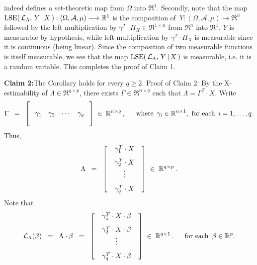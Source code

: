 indeed defines a set-theoretic map from $\Omega$ into $\Re^{1}$.
Secondly, note that the map
$\lse\!\left(\,\mathcal{L}_{\Lambda},\,Y\,\vert\,X\,\right) : (\Omega,\mathcal{A},\mu) \longrightarrow \Re^{1}$
is the composition of \,$Y : (\Omega,\mathcal{A},\mu) \rightarrow \Re^{n}$ followed by the
left multiplication by $\gamma^{T} \cdot \Pi_{X} \in \Re^{1 \times n}$ from $\Re^{n}$ into $\Re^{1}$.
$Y$ is measurable by hypothesis, while left multiplication by $\gamma^{T} \cdot \Pi_{X}$ is measurable
since it is continuous (being linear).
Since the composition of two measurable functions is itself measurable,
we see that the map $\lse\!\left(\,\mathcal{L}_{\Lambda},\,Y\,\vert\,X\,\right)$ is measurable,
i.e. it is a random variable.
This completes the proof of Claim 1.

\vskip 0.5cm
\noindent
\textbf{Claim 2:}\quad The Corollary holds for every $q \geq 2$.
\vskip 0.2cm
\noindent
Proof of Claim 2:\quad
By the X-estimability of $\Lambda \in \Re^{q \times p}$, there exists
$\Gamma \in \Re^{n \times q}$ such that $\Lambda = \Gamma^{T} \cdot X$.
Write
\begin{equation*}
\Gamma
\;\; = \;\;
	\left[\;\begin{array}{cccc}
	\\
	\gamma_{1} &
	\gamma_{2}&
	\cdots &
	\gamma_{q}
	\\ \\
	\end{array}\;\right]
	\;\in\; \Re^{n \times q}\,,
	\quad\;\;
	\textnormal{where \,$\gamma_{i} \in \Re^{n \times 1}$, \,for each \,$i = 1,\ldots,q$}.
\end{equation*}
Thus,
\begin{equation*}
\Lambda
\;\; = \;\;
	\left[\;\;\begin{array}{c}
	\gamma_{1}^{T} \cdot X \\
	\gamma_{2}^{T} \cdot \overset{{\color{white}\vert}}{X} \\
	\vdots \\
	\gamma_{q}^{T} \cdot \overset{{\color{white}\vert}}{X}
	\end{array}\;\;\right]
	\;\in\;\Re^{q \times p}\,.
\end{equation*}
Note that
\begin{equation*}
\mathcal{L}_{\Lambda}(\beta)
\;\; = \;\;
	\Lambda\cdot\beta
\;\; = \;\;
	\left[\;\;\begin{array}{c}
	\gamma_{1}^{T} \cdot X \cdot \beta \\
	\gamma_{2}^{T} \cdot \overset{{\color{white}\vert}}{X} \cdot \beta \\
	\vdots \\
	\gamma_{q}^{T} \cdot \overset{{\color{white}\vert}}{X} \cdot \beta
	\end{array}\;\;\right]
	\;\in\;\Re^{q \times 1}\,.
	\quad\;\;
	\textnormal{for each \,$\beta\in\Re^{p}$}.
\end{equation*}

